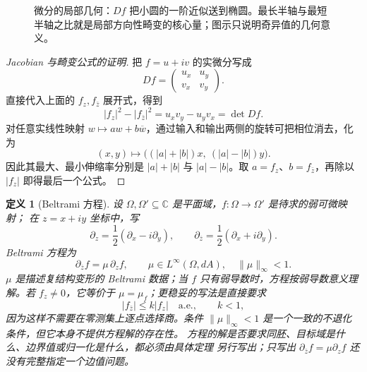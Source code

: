 \documentclass[UTF8,fontset=none,a4paper,11pt]{ctexart}
\theoremstyle{foundation-definition}
\newtheorem{definition}{定义}[section]
\theoremstyle{foundation-theorem}
\theoremstyle{foundation-proposition}
\theoremstyle{foundation-example}
\theoremstyle{foundation-remark}
\theoremstyle{foundation-theorem}
\newcommand{\C}{\mathbb C}
\begin{document}
\begin{figure}[htbp]
\centering
{}
\caption{微分的局部几何：\(Df\) 把小圆的一阶近似送到椭圆。最长半轴与最短半轴之比就是局部方向性畸变的核心量；图示只说明奇异值的几何意义。}
\label{fig:singular-value-ellipse}
\end{figure}

\begin{proof}[Jacobian 与畸变公式的证明]
把 \(f=u+iv\) 的实微分写成
\[
Df=\begin{pmatrix}u_x&u_y\\v_x&v_y\end{pmatrix}.
\]
直接代入上面的 \(f_z,f_{\bar z}\) 展开式，得到
\[
|f_z|^2-|f_{\bar z}|^2=u_xv_y-u_yv_x=\det Df.
\]
对任意实线性映射 \(w\mapsto aw+b\overline w\)，通过输入和输出两侧的旋转可把相位消去，化为
\[
(x,y)\longmapsto\bigl((|a|+|b|)x,\ (|a|-|b|)y\bigr).
\]
因此其最大、最小伸缩率分别是 \(|a|+|b|\) 与 \(|a|-|b|\)。取 \(a=f_z\)、\(b=f_{\bar z}\)，再除以 \(|f_z|\) 即得最后一个公式。
\end{proof}

\begin{definition}[Beltrami 方程]\label{def:beltrami}
设 \(\Omega,\Omega'\subseteq\C\) 是平面域，\(f:\Omega\to\Omega'\) 是待求的弱可微映射；
在 \(z=x+iy\) 坐标中，写
\[
\partial_z=\frac12(\partial_x-i\partial_y),
\qquad
\partial_{\overline z}=\frac12(\partial_x+i\partial_y).
\]
Beltrami 方程为
\[
\partial_{\overline z}f=\mu\,\partial_zf,
\qquad
\mu\in L^\infty(\Omega,dA),\quad \|\mu\|_\infty<1.
\]
\(\mu\) 是描述复结构变形的 Beltrami 数据；当 \(f\) 只有弱导数时，方程按弱导数意义理解。若 \(f_z\neq0\)，它等价于 \(\mu=\mu_f\)；更稳妥的写法是直接要求
\[
|f_{\bar z}|\leq k|f_z|\quad\text{a.e.},\qquad k<1,
\]
因为这样不需要在零测集上逐点选择商。条件 \(\|\mu\|_\infty<1\) 是一个一致的不退化条件，但它本身不提供方程解的存在性。
方程的解是否要求同胚、目标域是什么、边界值或归一化是什么，都必须由具体定理
另行写出；只写出 \(\partial_{\bar z}f=\mu\partial_zf\) 还没有完整指定一个边值问题。
\end{definition}
\end{document}
